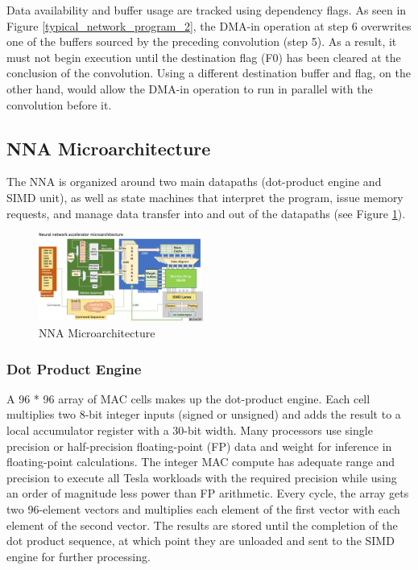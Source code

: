 \documentclass[letterpaper, 10 pt, conference]{ieeeconf}  %
\begin{document}
Data availability and buffer usage are tracked using dependency flags. As seen in Figure \ref{typical_network_program_2}, the DMA-in operation at step 6 overwrites one of the buffers sourced by the preceding convolution (step 5). As a result, it must not begin execution until the destination flag (F0) has been cleared at the conclusion of the convolution. Using a different destination buffer and flag, on the other hand, would allow the DMA-in operation to run in parallel with the convolution before it.

\subsection{NNA Microarchitecture}
The NNA is organized around two main datapaths (dot-product engine and SIMD unit), as well as state machines that interpret the program, issue memory requests, and manage data transfer into and out of the datapaths (see Figure \ref{NNA_Microarchitecture}).

\begin{figure}[hbt!]
\centering
\includegraphics[width=0.48\textwidth]{gfx/nna_microarchitecture.png}
\caption{NNA Microarchitecture}
\label{NNA_Microarchitecture}
\end{figure}

\subsubsection{Dot Product Engine}
A 96 * 96 array of MAC cells makes up the dot-product engine. Each cell multiplies two 8-bit integer inputs (signed or unsigned) and adds the result to a local accumulator register with a 30-bit width. Many processors use single precision or half-precision floating-point (FP) data and weight for inference in floating-point calculations. The integer MAC compute has adequate range and precision to execute all Tesla workloads with the required precision while using an order of magnitude less power than FP arithmetic. Every cycle, the array gets two 96-element vectors and multiplies each element of the first vector with each element of the second vector. The results are stored until the completion of the dot product sequence, at which point they are unloaded and sent to the SIMD engine for further processing.
\end{document}
